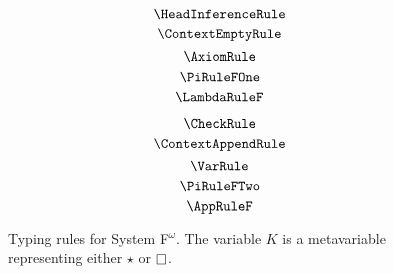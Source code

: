 
\begin{figure}
    \centering
    \begin{minipage}{0.5\textwidth}
        $$\HeadInferenceRule$$
        $$\ContextEmptyRule$$
        $$\AxiomRule$$
        $$\PiRuleFOne$$
        $$\LambdaRuleF$$
    \end{minipage}%
    \begin{minipage}{0.5\textwidth}
        $$\CheckRule$$
        $$\ContextAppendRule$$
        $$\VarRule$$
        $$\PiRuleFTwo$$
        $$\AppRuleF$$
    \end{minipage}%
    \caption{
        Typing rules for System F$^\omega$. The variable $K$ is a metavariable representing either $\star$ or $\kind$.
    }
    \label{fig:typing_f}
\end{figure}
